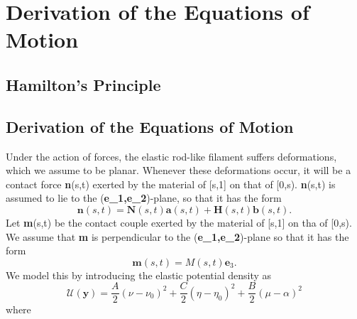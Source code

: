 \documentclass[12pt]{article}
\newcommand{\cB}{B}
\newcommand{\cA}{A}
\newcommand{\cC}{C}
\begin{document}
\section{Derivation of the Equations of Motion
}\label{Derivation of the Equations of Motion
}
\subsection{Hamilton's Principle}
\subsection{Derivation of the Equations of Motion}
Under the action of forces, the elastic rod-like filament suffers deformations, which we assume to be planar. Whenever these deformations occur, it will be a contact force \textbf{n}(s,t) exerted by the material of [s,1] on that of [0,s). \textbf{n}(s,t) is assumed to lie to the (\textbf{e_1,e_2})-plane, so that it has the form
\[  \textbf{n}(s,t)= \textbf{N} (s,t) \textbf{a}(s,t) + \textbf{H} (s,t) \textbf{b} (s,t).
\]
Let \textbf{m}(s,t) be the contact couple exerted by the material of [s,1] on tha of [0,s). We assume that \textbf{m} is perpendicular to the (\textbf{e_1,e_2})-plane so that it has the form
\[ 
\textbf{m}(s,t) = M(s,t)\textbf{e}_3.
\]
We model this by introducing the elastic potential density as
\[ \mathcal{U}(\textbf{y}) = \frac{\cA}{2} (\nu - \nu_0)^2
+\frac{\cC}{2} (\eta - \eta_0 )^2
+\frac{\cB}{2} (\mu -\alpha)^2 
\]
where
\end{document}
